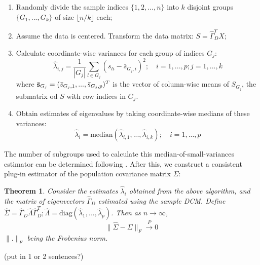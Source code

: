 \documentclass[12pt,letterpaper]{article}
\newtheorem{Theorem}{Theorem}[section]
\theoremstyle{definition} \newtheorem{Definition}[Theorem]{Definition}
\begin{document}
\begin{enumerate}
\item Randomly divide the sample indices $\{1,2,...,n\}$ into $k$ disjoint groups $\{G_1,...,G_k \}$ of size $\lfloor n/k \rfloor$ each;

\item Assume the data is centered. Transform the data matrix: $S = \hat\Gamma^T_D X$;

\item Calculate coordinate-wise variances for each group of indices $G_j$:
%
$$
\hat\lambda_{i,j} = \frac{1}{|G_j|} \sum_{l \in G_j} (s_{li} - \bar s_{G_j,i})^2; \quad i = 1,...,p; j = 1,...,k
$$
where $\bar{{\bf{s}}}_{G_j} = (\bar s_{G_j,1}, ..., \bar s_{G_j,p})^T$ is the vector of column-wise means of $S_{G_j}$, the submatrix od $S$ with row indices in $G_j$.
%
\item Obtain estimates of eigenvalues by taking coordinate-wise medians of these variances:
%
$$
\hat \lambda_i = \text{median} (\hat\lambda_{i,1}, ... , \hat\lambda_{i,k} ); \quad i = 1,...,p
$$
%
\end{enumerate}
%
The number of subgroups used to calculate this median-of-small-variances estimator can be determined following \citep{Minsker15}. After this, we construct a consistent plug-in estimator of the population covariance matrix $\Sigma$:

\begin{Theorem}\label{Thm:pluginSigma}
Consider the estimates $\hat\lambda_i$ obtained from the above algorithm, and the matrix of eigenvectors $\hat\Gamma_D$ estimated using the sample DCM. Define $\hat\Sigma = \hat\Gamma_D \hat\Lambda \hat\Gamma_D^T; \hat\Lambda = \text{diag}(\hat\lambda_1, ..., \hat\lambda_p)$. Then as $n \rightarrow \infty$,
%
$$ \| \hat\Sigma - \Sigma \|_F \stackrel{P}{\rightarrow} 0 $$
%
$\|.\|_F$ being the Frobenius norm.
\end{Theorem}

{\colrbf (put in 1 or 2 sentences?)}
\end{document}
